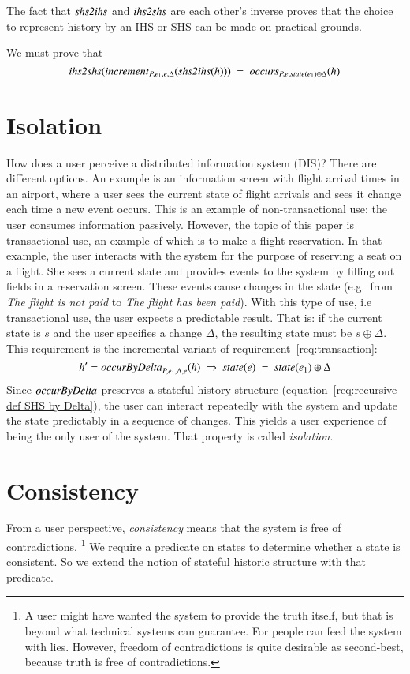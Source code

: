 \documentclass{elsarticle}
\def\id#1{\text{\em #1\/}}
\begin{document}
	The fact that $\id{shs2ihs}$ and $\id{ihs2shs}$ are each other's inverse proves that the choice to represent
	history by an IHS or SHS can be made on practical grounds.

	We must prove that
\begin{equation}
	\id{ihs2shs}(\id{increment}_{P,e_1,e,\Delta}(\id{shs2ihs}(h)))\ =\ \id{occurs}_{P,e,\id{state}(e_1)\oplus\Delta}(h)
\end{equation}

\section{Isolation}
\label{sct:Isolation}
	How does a user perceive a distributed information system (DIS)?
	There are different options.
	An example is an information screen with flight arrival times in an airport,
	where a user sees the current state of flight arrivals and sees it change each time a new event occurs.
	This is an example of non-transactional use: the user consumes information passively.
	However, the topic of this paper is transactional use,
	an example of which is to make a flight reservation.
	In that example, the user interacts with the system for the purpose of reserving a seat on a flight.
	She sees a current state and provides events to the system by filling out fields in a reservation screen.
	These events cause changes in the state (e.g.\ from {\em The flight is not paid} to {\em The flight has been paid}).
	With this type of use, i.e transactional use, the user expects a predictable result.
	That is: if the current state is $s$ and the user specifies a change $\Delta$,
	the resulting state must be $s\oplus\Delta$.
	This requirement is the incremental variant of requirement~\ref{req:transaction}:
\begin{equation}
	h'=\id{occurByDelta}_{P,e_1,\Delta,e}(h)\ \Rightarrow\ \id{state}(e)\ =\ \id{state}(e_1)\oplus\Delta
\label{req:occurByDelta}
\end{equation}
	Since $\id{occurByDelta}$ preserves a stateful history structure (equation~\ref{req:recursive def SHS by Delta}),
	the user can interact repeatedly with the system and update the state predictably in a sequence of changes.
	This yields a user experience of being the only user of the system.
	That property is called {\em isolation}.

\section{Consistency}
\label{sct:Consistency}
	From a user perspective, {\em consistency} means that the system is free of contradictions.%
\footnote{A user might have wanted the system to provide the truth itself,
	but that is beyond what technical systems can guarantee. For people can feed the system with lies.
	However, freedom of contradictions is quite desirable as second-best, because truth is free of contradictions.}
	We require a predicate on states to determine whether a state is consistent.
	So we extend the notion of stateful historic structure with that predicate.
\end{document}
